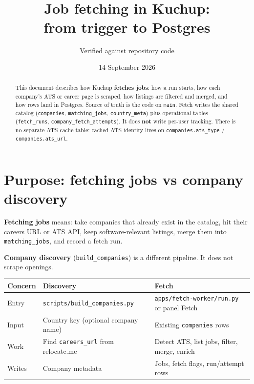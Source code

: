 \documentclass[11pt,a4paper]{article}
\title{Job fetching in Kuchup:\\from trigger to Postgres}
\author{Verified against repository code}
\date{14 September 2026}
\begin{document}
\maketitle

\begin{abstract}
This document describes how Kuchup \textbf{fetches jobs}: how a run starts,
how each company's ATS or career page is scraped, how listings are filtered
and merged, and how rows land in Postgres. Source of truth is the code on
\texttt{main}. Fetch writes the shared catalog
(\texttt{companies}, \texttt{matching\_jobs}, \texttt{country\_meta}) plus
operational tables (\texttt{fetch\_runs}, \texttt{company\_fetch\_attempts}).
It does \textbf{not} write per-user tracking.
There is no separate ATS-cache table: cached ATS identity lives on
\texttt{companies.ats\_type} / \texttt{companies.ats\_url}.
\end{abstract}

\tableofcontents
\newpage

\section{Purpose: fetching jobs vs company discovery}

\textbf{Fetching jobs} means: take companies that already exist in the catalog,
hit their careers URL or ATS API, keep software-relevant listings, merge them
into \texttt{matching\_jobs}, and record a fetch run.

\textbf{Company discovery} (\texttt{build\_companies}) is a different pipeline.
It does not scrape openings.

\begin{center}
\begin{tabularx}{\textwidth}{l X X}
  \toprule
  \textbf{Concern} & \textbf{Discovery} & \textbf{Fetch} \\
  \midrule
  Entry &
    \texttt{scripts/build\_companies.py} &
    \texttt{apps/fetch-worker/run.py} or panel Fetch \\
  Input &
    Country key (optional company name) &
    Existing \texttt{companies} rows \\
  Work &
    Find \texttt{careers\_url} from relocate.me &
    Detect ATS, list jobs, filter, merge, enrich \\
  Writes &
    Company metadata &
    Jobs, fetch flags, run/attempt rows \\
  \bottomrule
\end{tabularx}
\end{center}
\end{document}
